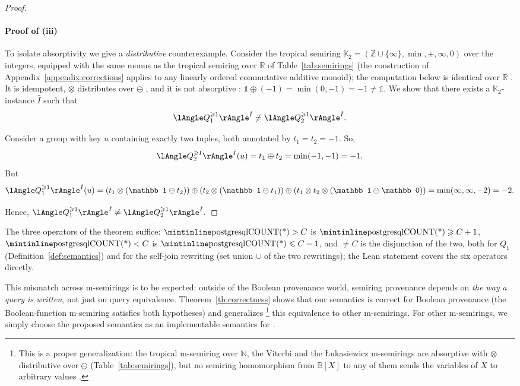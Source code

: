 \begin{proof}
\paragraph*{Proof of (iii)}
To isolate absorptivity we give a \emph{distributive} counterexample.
Consider the tropical semiring
$\mathbb K_2=(\mathbb{Z}\cup\{\infty\},\min,+,\infty,0)$ over the
integers, equipped with the same monus as the tropical semiring over
$\mathbb R$ of Table~\ref{tab:semirings} (the construction of
Appendix~\ref{appendix:corrections} applies to any linearly ordered
commutative additive monoid); the computation below is identical over
$\mathbb R$ .
It is idempotent, $\otimes$ distributes over $\ominus$
, and it is
not absorptive
:
$\mathbb 1\oplus(-1)=\min(0,-1)=-1\neq\mathbb 1$.
We show that there exists a $\mathbb K_2$-instance $\hat I$ such that
\[
\angsem{\hat I}{Q^{\geq 1}_1}
\neq
\angsem{\hat I}{Q^{\geq 1}_2}.
\]

Consider a group with key $u$ containing exactly two tuples,
both annotated by
$
t_1=t_2=-1$.
So,
\[
\angsem{\hat I}{Q^{\ge1}_2}(u)
=
t_1\oplus t_2
=
\min(-1,-1)
=
-1.
\]
But
\[
\angsem{\hat I}{Q^{\ge1}_1}(u)
=
(t_1\otimes(\mathbb 1 \ominus t_2)) \oplus (t_2\otimes(\mathbb 1 \ominus t_1))\oplus (t_1\otimes t_2\otimes(\mathbb 1 \ominus \mathbb 0))
=
\min(\infty,\infty,-2)
=
-2.
\]

Hence,
$
\angsem{\hat I}{Q^{\ge1}_1}
\neq
\angsem{\hat I}{Q^{\ge1}_2}.
$
\end{proof}

The three operators of the theorem suffice: $\text{\sql{COUNT(*)}}>C$ is
$\text{\sql{COUNT(*)}}\geq C+1$, $\text{\sql{COUNT(*)}}<C$ is
$\text{\sql{COUNT(*)}}\leq C-1$, and $\neq C$ is the disjunction of the two,
both for $Q_1$ (Definition~\ref{def:semantics}) and for the self-join
rewriting (set union $\cup$ of the two rewritings); the Lean statement
covers the six operators directly.

This mismatch across m-semirings is to be expected: outside of
the Boolean provenance world, semiring provenance depends on \emph{the way
a query is written}, not just on query equivalence.
Theorem~\ref{th:correctness} shows that our semantics is correct for
Boolean provenance (the Boolean-function m-semiring satisfies both
hypotheses) and generalizes%
\footnote{This is a proper generalization: the tropical m-semiring
  over $\mathbb{N}$, the Viterbi and the \L ukasiewicz m-semirings are
  absorptive with $\otimes$ distributive over $\ominus$
  (Table~\ref{tab:semirings}), but no semiring homomorphism from
  $\mathbb{B}[X]$ to any of them sends the variables of $X$ to arbitrary
  values
.}
this equivalence to
other m-semirings. For other m-semirings, we simply choose the proposed
semantics as an implementable semantics for .


